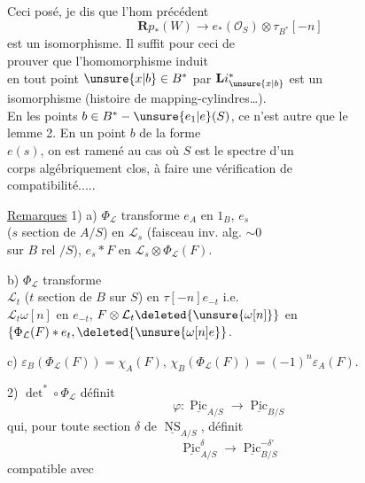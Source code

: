 Ceci posé, je dis que l'hom précédent
\[
\mathbf Rp_*(W)\longrightarrow e_*(\mathcal O_S)\otimes\tau_{B^*}[-n]
\]
est un isomorphisme. Il suffit pour ceci de\\
prouver que l'homomorphisme induit \\
en tout point $\unsure{x|b}\in B^*$ par $\mathbf Li_{\unsure{x|b}}^*$ est un\\
isomorphisme (histoire de mapping-cylindres\ldots).\\
En les points $b\in B^*-\unsure{e_1|e}(S)$, ce n'est autre que le\\
lemme 2. En un point  $b$ de la forme\\
$e(s)$, on est ramené au cas où $S$ est le spectre d'un\\
corps algébriquement clos, à faire une vérification de\\
compatibilité.....

\uline{Remarques} 1) a) $\Phi_{\mathcal L}$ transforme $e_A$ en $1_B$, $e_s$\\
($s$ section de $A/S$) en $\mathcal L_s$ (faisceau inv. alg. $\sim0$\\
sur $B$ rel $/S$),  $e_s*F$ en $\mathcal L_s\otimes\Phi_{\mathcal L}(F)$.

b) $\Phi_{\mathcal L}$ transforme \\
$\mathcal L_t$ ($t$ section de $B$ sur $S$) en $\tau[-n]e_{-t}$ i.e.\\
$\mathcal L_t\omega[n]$ en $e_{-t}$,  $F\otimes\mathcal L_t\deleted{\unsure{\omega[n]}}$ en $\{\Phi_{\mathcal L}(F)*e_t,\deleted{\unsure{\omega[n]e}}$.

c) $\varepsilon_B(\Phi_{\mathcal L}(F))=\chi_A(F)$, $\chi_B(\Phi_{\mathcal L}(F))=(-1)^n\varepsilon_A(F)$.

2) $\det^*\circ\Phi_{\mathcal L}$ définit 
\[
\varphi:\underline{\operatorname{Pic}}_{A/S}\longrightarrow\underline{\operatorname{Pic}}_{B/S}
\]
qui, pour toute section $\delta$ de $\underline{\operatorname{NS}}_{A/S}$, définit
\[
\underline{\operatorname{Pic}}^\delta_{A/S}\longrightarrow\underline{\operatorname{Pic}}^{-\delta'}_{B/S}
\]
compatible avec
